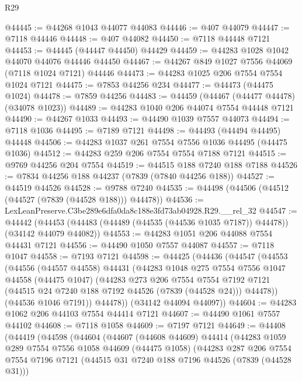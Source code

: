 \begin{lexlean}{R29}
\begin{coremodule}
@44445 := @44268 @1043 @44077 @44083
@44446 := @407 @44079
@44447 := @7118 @44446
@44448 := @407 @44082
@44450 := @7118 @44448 @7121
@44453 := @44445 (@44447 @44450) @44429
@44459 := @44283 @1028 @1042 @44070 @44076 @44446 @44450
@44467 := @44267 @849 @1027 @7556 @44069 (@7118 @1024 @7121) @44446
@44473 := @44283 @1025 @206 @7554 @7554 @1024 @7121
@44475 := @7853 @44256 @234
@44477 := @44473 (@44475 @1024)
@44478 := @7859 @44256
@44483 := @44459 (@44467 (@44477 @44478) (@34078 @1023))
@44489 := @44283 @1040 @206 @44074 @7554 @44448 @7121
@44490 := @44267 @1033
@44493 := @44490 @1039 @7557 @44073
@44494 := @7118 @1036
@44495 := @7189 @7121
@44498 := @44493 (@44494 @44495) @44448
@44506 := @44283 @1037 @261 @7554 @7556 @1036 @44495 (@44475 @1036)
@44512 := @44283 @259 @206 @7554 @7554 @7188 @7121
@44515 := @9769 @44256 @204 @7554
@44519 := @44515 @188 @7240 @188 @7188
@44526 := @7834 @44256 @188 @44237 (@7839 (@7840 @44256 @188))
@44527 := @44519 @44526
@44528 := @9788 @7240
@44535 := @44498 (@44506 (@44512 (@44527 (@7839 (@44528 @188))) @44478))
@44536 := LexLeanPreserve.C3be289e6dfa0da8c188e3fd73ab04928.R29.__rel_32
@44547 := @44442
    (@44453 (@44483 (@44489 (@44535 (@44536 @1035 @7187)) @44478)) (@34142 @44079 @44082))
@44553 := @44283 @1051 @206 @44088 @7554 @44431 @7121
@44556 := @44490 @1050 @7557 @44087
@44557 := @7118 @1047
@44558 := @7193 @7121
@44598 := @44425
    (@44436
      (@44547
        (@44553
          (@44556
            (@44557 @44558)
            @44431
            (@44283
              @1048
              @275
              @7554
              @7556
              @1047
              @44558
              (@44475 @1047)
              (@44283
                @273
                @206
                @7554
                @7554
                @7192
                @7121
                (@44515 @24 @7240 @188 @7192 @44526 (@7839 (@44528 @24)))
                @44478))
            (@44536 @1046 @7191))
          @44478))
      (@34142 @44094 @44097))
@44604 := @44283 @1062 @206 @44103 @7554 @44414 @7121
@44607 := @44490 @1061 @7557 @44102
@44608 := @7118 @1058
@44609 := @7197 @7121
@44649 := @44408
    (@44419
      (@44598
        (@44604
          (@44607
            (@44608 @44609)
            @44414
            (@44283
              @1059
              @289
              @7554
              @7556
              @1058
              @44609
              (@44475 @1058)
              (@44283
                @287
                @206
                @7554
                @7554
                @7196
                @7121
                (@44515 @31 @7240 @188 @7196 @44526 (@7839 (@44528 @31)))

\end{coremodule}
\end{lexlean}
